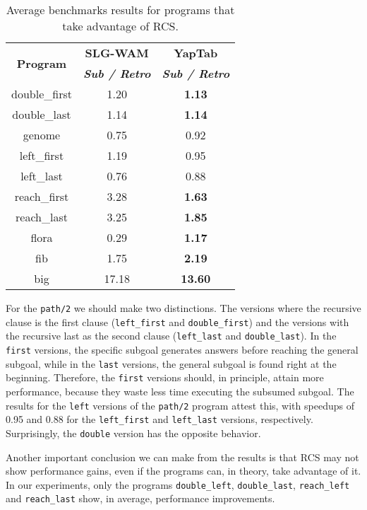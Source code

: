 \begin{table}[ht]
\centering
  \begin{tabular}{ccc}
   \hline
    \hline
    \multirow{2}{*}{\textbf{Program}} & \textbf{SLG-WAM} & \textbf{YapTab} \\
    & \textbf{\textit{\small{Sub / Retro}}} & \textbf{\textit{\small{Sub / Retro}}} \\
   \hline
   \hline
double\_first & 1.20 & \textbf{1.13} \\
double\_last & 1.14 & \textbf{1.14} \\
genome & 0.75 & 0.92 \\
left\_first & 1.19 & 0.95 \\
left\_last & 0.76  & 0.88 \\
reach\_first  & 3.28 & \textbf{1.63} \\
reach\_last  & 3.25 & \textbf{1.85} \\
flora & 0.29 & \textbf{1.17} \\
fib & 1.75 & \textbf{2.19} \\
big & 17.18 & \textbf{13.60} \\
\hline
\hline
\end{tabular}
\caption{Average benchmarks results for programs that take advantage of RCS.}
\label{tbl:results_gain_overview}
\end{table}

For the \texttt{path/2} we should make two distinctions. The versions where the recursive clause is the first
clause (\texttt{left\_first} and \texttt{double\_first}) and the versions with the recursive last as the second
clause (\texttt{left\_last} and \texttt{double\_last}). In the \texttt{first} versions, the specific subgoal
generates answers before reaching the general subgoal, while in the \texttt{last} versions, the general subgoal
is found right at the beginning. Therefore, the \texttt{first} versions should, in principle, attain more performance,
because they waste less time executing the subsumed subgoal. The results for the \texttt{left} versions of the
\texttt{path/2} program attest this, with speedups of 0.95 and 0.88 for the \texttt{left\_first} and
\texttt{left\_last} versions, respectively. Surprisingly, the \texttt{double} version has the opposite behavior.

Another important conclusion we can make from the results is that RCS may not show performance gains, even if the
programs can, in theory, take advantage of it. In our experiments, only the programs \texttt{double\_left},
\texttt{double\_last}, \texttt{reach\_left} and \texttt{reach\_last} show, in average, performance improvements.

